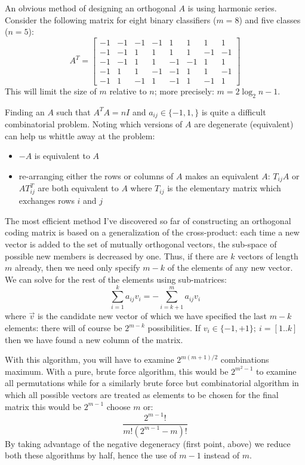 An obvious method of designing an orthogonal $A$ is using harmonic series.
Consider the following matrix for eight binary classifiers ($m=8$) and
five classes ($n=5$):
\begin{equation}
	A^T = \left [ \begin{array}{rrrrrrrr}
			-1 & -1 & -1 & -1 & 1 & 1 & 1 & 1 \\
			-1 & -1 & 1 & 1 & 1 & 1 & -1 & -1 \\
			-1 & -1 & 1 & 1 & -1 & -1 & 1 & 1 \\
			-1 & 1 & 1 & -1 & -1 & 1 & 1 & -1 \\
			-1 & 1 & -1 & 1 & -1 & 1 & -1 & 1
	\end{array} \right ]
\end{equation}
This will limit the size of $m$ relative to $n$; more precisely:
$m=2 \log_2 n - 1$.

Finding an $A$ such that $A^T A = n I$ and $a_{ij} \in \lbrace -1, 1, \rbrace$
is quite a difficult combinatorial problem.
Noting which versions of $A$ are degenerate (equivalent) can help us whittle
away at the problem:
\begin{itemize}
	\item $-A$ is equivalent to $A$
	\item re-arranging either the rows or columns of $A$ makes an equivalent $A$: $T_{ij} A$ or $A T_{ij}^T$ are both equivalent to $A$ where $T_{ij}$ is the elementary matrix which exchanges rows $i$ and $j$
\end{itemize}

The most efficient method I've discovered so far of constructing an orthogonal
coding matrix is based on a generalization of the cross-product:
each time a new vector is added to the set of mutually orthogonal vectors, 
the sub-space of possible new members is decreased by one.
Thus, if there are $k$ vectors of length $m$ already, then we need only specify $m-k$
of the elements of any new vector.
We can solve for the rest of the elements using sub-matrices:
\begin{equation}
	\sum_{i=1}^{k} a_{ij} v_i = - \sum_{i=k+1}^m a_{ij} v_i
\end{equation}
where $\vec v$ is the candidate new vector of which we have specified the last
$m-k$ elements: there will of course be $2^{m-k}$ possibilities.
If $v_i \in \lbrace -1, +1 \rbrace;~i=[1..k]$ then we have found a new 
column of the matrix.

With this algorithm, you will have to examine $2^{m(m+1)/2}$ combinations
maximum.
With a pure, brute force algorithm, this would be $2^{m^2-1}$ to examine all
permutations while for a similarly brute force but combinatorial algorithm 
in which all possible vectors are treated as elements to be chosen for the 
final matrix this would be $2^{m-1}$ choose $m$ or:
\begin{equation}
	\frac{2^{m-1}!}{m!(2^{m-1}-m)!}
\end{equation}
By taking advantage of the negative degeneracy (first point, above) 
we reduce both these algorithms by half, hence the use of $m-1$ instead of $m$.

